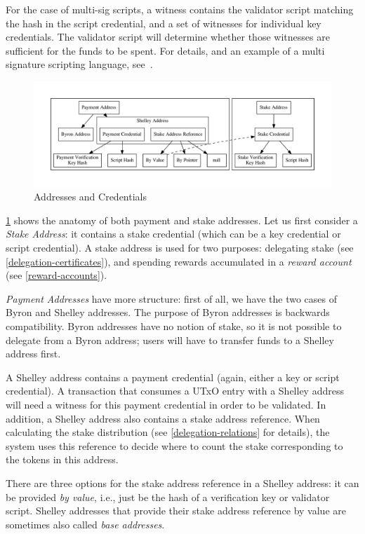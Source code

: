 \documentclass[11pt,a4paper,dvipsnames,twosided]{article}
\newcommand{\citep}[1]{\cite{#1}}
\begin{document}
For the case of multi-sig scripts, a witness contains the validator script
matching the hash in the script credential, and a set of witnesses for
individual key credentials. The validator script will determine whether those
witnesses are sufficient for the funds to be spent. For details, and an example
of a multi signature scripting language, see~\citep{multi-sig-scripts}.

\begin{figure}[ht]
  \includegraphics[width=\linewidth]{addresses.pdf}
  \caption{Addresses and Credentials}
  \label{fig:addresses}
\end{figure}

\cref{fig:addresses} shows the anatomy of both payment and stake addresses. Let
us first consider a \emph{Stake Address}: it contains a stake credential (which
can be a key credential or script credential). A stake address is used for two
purposes: delegating stake (see \cref{delegation-certificates}), and spending
rewards accumulated in a \emph{reward account} (see \cref{reward-accounts}).

\emph{Payment Addresses} have more structure: first of all, we have the two
cases of Byron and Shelley addresses. The purpose of Byron addresses is
backwards compatibility. Byron addresses have no notion of stake, so it is not
possible to delegate from a Byron address; users will have to transfer funds to
a Shelley address first.

A Shelley address contains a payment credential (again, either a key or script
credential). A transaction that consumes a UTxO entry with a Shelley address
will need a witness for this payment credential in order to be validated. In
addition, a Shelley address also contains a stake address reference. When
calculating the stake distribution (see \cref{delegation-relations} for
details), the system uses this reference to decide where to count the stake
corresponding to the tokens in this address.

There are three options for the stake address reference in a Shelley address: it
can be provided \emph{by value}, i.e., just be the hash of a verification key or
validator script. Shelley addresses that provide their stake address reference
by value are sometimes also called \emph{base addresses}.
\end{document}
